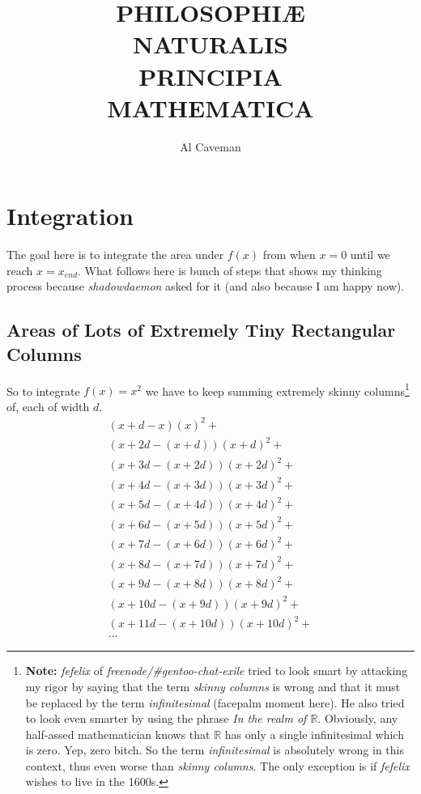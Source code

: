 \documentclass{report}
\title{\Huge\sc \textbf{PHILOSOPHI\AE}\\ NATURALIS\\ \textbf{PRINCIPIA}\\ MATHEMATICA}
\author{Al Caveman}
\begin{document}
\maketitle
\tableofcontents

\chapter{Integration}
The goal here is to integrate the area under $f(x)$ from when $x = 0$ until we
reach $x = x_{end}$. What follows here is bunch of steps that shows my thinking
process because \emph{shadowdaemon} asked for it (and also because I am happy now).

\section{Areas of Lots of Extremely Tiny Rectangular Columns}
So to integrate $f(x) = x^2$ we have to keep summing extremely skinny
columns\footnote{\textbf{Note:} \emph{fefelix} of
\emph{freenode/\#gentoo-chat-exile} tried to look smart by attacking my rigor
by saying that the term \emph{skinny columns} is wrong and that it must be
replaced by the term \emph{infinitesimal} (facepalm moment here). He also tried
to look even smarter by using the phrase \emph{In the realm of $\mathbb{R}$}.
Obviously, any half-assed mathematician knows that $\mathbb{R}$ has only a
single infinitesimal which is zero. Yep, zero bitch. So the term
\emph{infinitesimal} is absolutely wrong in this context, thus even worse than
\emph{skinny columns}. The only exception is if \emph{fefelix} wishes to live
in the 1600s.} of, each of width $d$.
\[\begin{split}
  (x+d-x)(x)^2 + \\
  (x+2d-(x+d))(x+d)^2 + \\
  (x+3d-(x+2d))(x+2d)^2 + \\
  (x+4d-(x+3d))(x+3d)^2 + \\
  (x+5d-(x+4d))(x+4d)^2 + \\
  (x+6d-(x+5d))(x+5d)^2 + \\
  (x+7d-(x+6d))(x+6d)^2 + \\
  (x+8d-(x+7d))(x+7d)^2 + \\
  (x+9d-(x+8d))(x+8d)^2 + \\
  (x+10d-(x+9d))(x+9d)^2 + \\
  (x+11d-(x+10d))(x+10d)^2 + \\
  \ldots
\end{split}\]
\end{document}
